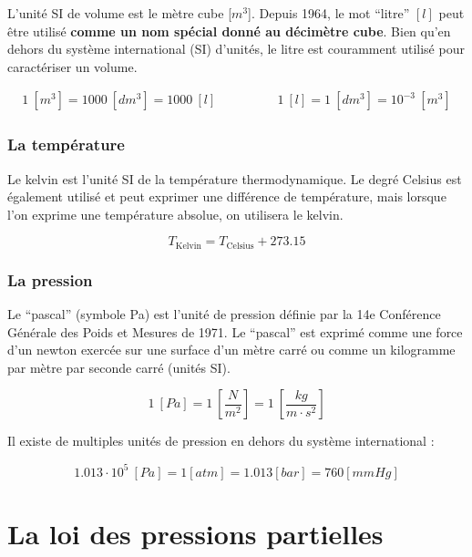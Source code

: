 \documentclass[
  11pt,
  a4paper,
  openany]{book}
\begin{document}
L'unité SI de volume est le mètre cube {[}\(m^3\){]}. Depuis 1964, le mot ``litre'' \([l]\) peut être utilisé \textbf{comme un nom spécial donné au décimètre cube}. Bien qu'en dehors du système international (SI) d'unités, le litre est couramment utilisé pour caractériser un volume.

\[
\begin{split}
  1\ \left[m^3\right] = 1000\ \left[dm^3\right] = 1000\ \left[l\right]
\end{split}
\qquad\qquad
\begin{split}
    1\ \left[l\right] = 1\ \left[dm^3\right] = 10^{-3}\ \left[m^3\right]
\end{split}
\]

\subsubsection{La température}\label{la-tempuxe9rature}

Le kelvin est l'unité SI de la température thermodynamique. Le degré Celsius est également utilisé et peut exprimer une différence de température, mais lorsque l'on exprime une température absolue, on utilisera le kelvin.

\[
T_{{\mathrm{Kelvin}}}=T_{{\mathrm {Celsius}}} + 273.15
\]

\subsubsection{La pression}\label{la-pression}

Le ``pascal'' (symbole Pa) est l'unité de pression définie par la 14e Conférence Générale des Poids et Mesures de 1971. Le ``pascal'' est exprimé comme une force d'un newton exercée sur une surface d'un mètre carré ou comme un kilogramme par mètre par seconde carré (unités SI).

\[
1\ \left[Pa\right] = 1\ \left[\frac{N}{m^2}\right] = 1\ \left[\frac{kg}{m \cdot s^2}\right]
\]

Il existe de multiples unités de pression en dehors du système international :

\[
1.013 \cdot 10^{5}\ \left[Pa\right] =
1 \left[atm\right] =
1.013 \left[bar\right] =
760 \left[mmHg\right]
\]

\section{La loi des pressions partielles}\label{la-loi-des-pressions-partielles}
\end{document}
